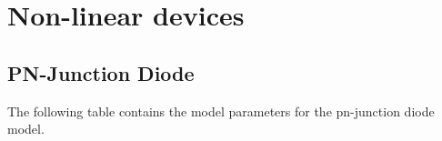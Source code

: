 %
%
%
%

\chapter{Non-linear devices}
\label{sec:NLdevices}

\section{PN-Junction Diode}

The following table contains the model parameters for the pn-junction
diode model.

\addvspace{12pt}

